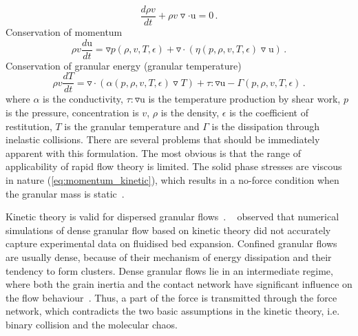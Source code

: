 \begin{equation}
\frac{d \rho v}{dt} + \rho v \triangledown \cdot \mathrm{u} = 0 \,.
\end{equation}
\noindent Conservation of momentum
\begin{equation}
\label{eq:momentum_kinetic}
\rho v \frac{d \mathrm{u}}{dt} = \triangledown p(\rho,v,T,\epsilon) + 
\triangledown \cdot ( \eta (p,\rho,v,T,\epsilon)  \triangledown \mathrm{u}) \,.
\end{equation}
\noindent Conservation of granular energy (granular temperature)
\begin{equation}
\rho v \frac{d T}{dt} = \triangledown \cdot ( \alpha (p,\rho,v,T,\epsilon)  
\triangledown T) + \tau : \triangledown \mathrm{u} - \Gamma 
(p,\rho,v,T,\epsilon)  \,.
\end{equation}
where $\alpha$ is the conductivity, $\tau : \triangledown \mathrm{u}$ is the 
temperature production by shear work, $p$ is the pressure, concentration is 
$v$, $\rho$ is the density, $\epsilon$ is the coefficient of restitution, $T$ 
is the granular temperature and $\Gamma$ is the dissipation through inelastic 
collisions. There are several problems that should be immediately
apparent with this formulation. The most obvious is that the
range of applicability of rapid flow theory is limited. The solid phase 
stresses are viscous in nature (\cref{eq:momentum_kinetic}), which results in 
a no-force condition when the granular mass is static~\citep{Campbell2006}.

Kinetic theory is valid for dispersed granular flows~\citep{Ng2008}.
~\citet{VanWachem2001} observed that numerical simulations of dense 
granular flow based on kinetic theory did not accurately capture
experimental data on fluidised bed expansion. Confined granular flows are 
usually dense, because of their mechanism of energy dissipation and their 
tendency to form clusters. Dense granular flows lie in an intermediate 
regime, where both the grain inertia and the contact network have significant 
influence on the flow behaviour~\citep{Pouliquen2002}. Thus, a part of the 
force is transmitted through the force network, which contradicts the two basic 
assumptions in the kinetic theory, i.e. binary collision and the molecular 
chaos. 

